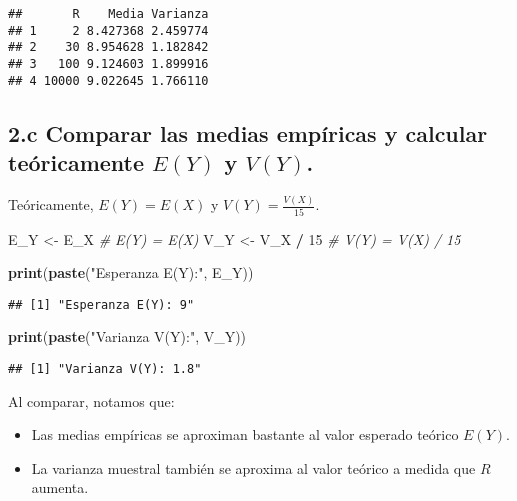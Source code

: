 \documentclass[
]{article}
\newenvironment{Shaded}{\begin{snugshade}}{\end{snugshade}}
\newcommand{\CommentTok}[1]{\textcolor[rgb]{0.56,0.35,0.01}{\textit{#1}}}
\newcommand{\DecValTok}[1]{\textcolor[rgb]{0.00,0.00,0.81}{#1}}
\newcommand{\FunctionTok}[1]{\textcolor[rgb]{0.13,0.29,0.53}{\textbf{#1}}}
\newcommand{\NormalTok}[1]{#1}
\newcommand{\OtherTok}[1]{\textcolor[rgb]{0.56,0.35,0.01}{#1}}
\newcommand{\SpecialCharTok}[1]{\textcolor[rgb]{0.81,0.36,0.00}{\textbf{#1}}}
\newcommand{\StringTok}[1]{\textcolor[rgb]{0.31,0.60,0.02}{#1}}
\providecommand{\tightlist}{%
  \setlength{\itemsep}{0pt}\setlength{\parskip}{0pt}}
\begin{document}
\begin{verbatim}
##       R    Media Varianza
## 1     2 8.427368 2.459774
## 2    30 8.954628 1.182842
## 3   100 9.124603 1.899916
## 4 10000 9.022645 1.766110
\end{verbatim}

\subsection{\texorpdfstring{2.c Comparar las medias empíricas y calcular
teóricamente \(E(Y)\) y
\(V(Y)\).}{2.c Comparar las medias empíricas y calcular teóricamente E(Y) y V(Y).}}\label{c-comparar-las-medias-empuxedricas-y-calcular-teuxf3ricamente-ey-y-vy.}

Teóricamente, \(E(Y) = E(X)\) y \(V(Y) = \frac{V(X)}{15}\).

\begin{Shaded}
\begin{Highlighting}[]
\NormalTok{E\_Y }\OtherTok{\textless{}{-}}\NormalTok{ E\_X  }\CommentTok{\# E(Y) = E(X)}
\NormalTok{V\_Y }\OtherTok{\textless{}{-}}\NormalTok{ V\_X }\SpecialCharTok{/} \DecValTok{15}  \CommentTok{\# V(Y) = V(X) / 15}

\FunctionTok{print}\NormalTok{(}\FunctionTok{paste}\NormalTok{(}\StringTok{"Esperanza E(Y):"}\NormalTok{, E\_Y))}
\end{Highlighting}
\end{Shaded}

\begin{verbatim}
## [1] "Esperanza E(Y): 9"
\end{verbatim}

\begin{Shaded}
\begin{Highlighting}[]
\FunctionTok{print}\NormalTok{(}\FunctionTok{paste}\NormalTok{(}\StringTok{"Varianza V(Y):"}\NormalTok{, V\_Y))}
\end{Highlighting}
\end{Shaded}

\begin{verbatim}
## [1] "Varianza V(Y): 1.8"
\end{verbatim}

Al comparar, notamos que:

\begin{itemize}
\tightlist
\item
  Las medias empíricas se aproximan bastante al valor esperado teórico
  \(E(Y)\).
\item
  La varianza muestral también se aproxima al valor teórico a medida que
  \(R\) aumenta.
\end{itemize}
\end{document}
